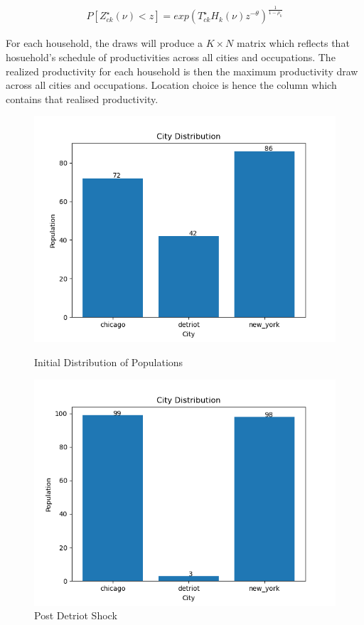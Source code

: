 \documentclass[10pt]{article}
\begin{document}
\begin{align}
    P[Z_{ck}^{\star}(\nu) < z] = exp(T_{ck}^{\star} H_k(\nu) z^{-\theta})^{\frac{1}{1 - \rho_k}}
\end{align}

For each household, the draws will produce a $K \times N$ matrix which reflects that hosuehold's schedule of productivities across all cities and occupations. The realized productivity for each household is then the maximum productivity draw across all cities and occupations. Location choice is hence the column which contains that realised productivity.

\begin{figure}[h]
    \begin{minipage}{0.5\textwidth}
        \centering
        \includegraphics[width=\textwidth]{../simulations/graphs/city_pop.png}
        \caption{Initial Distribution of Populations}
        \label{city_pop}
    \end{minipage}%
    \begin{minipage}{0.5\textwidth}
        \centering
        \includegraphics[width=\textwidth]{../simulations/graphs/c_shock.png}
        \caption{Post Detriot Shock}
        \label{c_shock}
    \end{minipage}
\end{figure}
\end{document}
